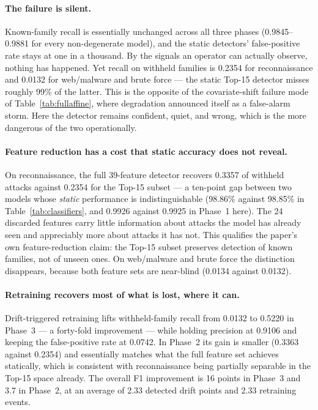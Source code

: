 \documentclass[11pt,a4paper]{article}
\begin{document}
\paragraph{The failure is silent.} Known-family recall is essentially unchanged
across all three phases (0.9845--0.9881 for every non-degenerate model), and the
static detectors' false-positive rate stays at one in a thousand. By the signals
an operator can actually observe, nothing has happened. Yet recall on withheld
families is 0.2354 for reconnaissance and 0.0132 for web/malware and brute
force --- the static Top-15 detector misses roughly 99\% of the latter. This is
the opposite of the covariate-shift failure mode of
Table~\ref{tab:fullaffine}, where degradation announced itself as a
false-alarm storm. Here the detector remains confident, quiet, and wrong, which
is the more dangerous of the two operationally.

\paragraph{Feature reduction has a cost that static accuracy does not reveal.}
On reconnaissance, the full 39-feature detector recovers 0.3357 of withheld
attacks against 0.2354 for the Top-15 subset --- a ten-point gap between two
models whose \emph{static} performance is indistinguishable (98.86\% against
98.85\% in Table~\ref{tab:classifiers}, and 0.9926 against 0.9925 in Phase~1
here). The 24 discarded features carry little information about attacks the
model has already seen and appreciably more about attacks it has not. This
qualifies the paper's own feature-reduction claim: the Top-15 subset preserves
detection of known families, not of unseen ones. On web/malware and brute force
the distinction disappears, because both feature sets are near-blind (0.0134
against 0.0132).

\paragraph{Retraining recovers most of what is lost, where it can.} Drift-triggered
retraining lifts withheld-family recall from 0.0132 to 0.5220 in Phase~3 --- a
forty-fold improvement --- while holding precision at 0.9106 and keeping the
false-positive rate at 0.0742. In Phase~2 its gain is smaller (0.3363 against
0.2354) and essentially matches what the full feature set achieves statically,
which is consistent with reconnaissance being partially separable in the Top-15
space already. The overall F1 improvement is 16 points in Phase~3 and 3.7 in
Phase~2, at an average of 2.33 detected drift points and 2.33 retraining events.
\end{document}
